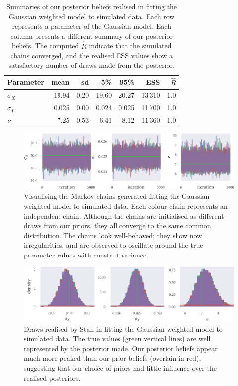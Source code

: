\begin{table}[tbp]
  \begin{tabular}{@{}lrrrrrr@{}}
    \toprule
    Parameter    & mean  & sd   & 5\%   & 95\%  & ESS     & $\widehat{R}$ \\
    \midrule
    $\sigma_{X}$ & 19.94 & 0.20 & 19.60 & 20.27 & 13\,310 & 1.0           \\
    $\sigma_{Y}$ & 0.025 & 0.00 & 0.024 & 0.025 & 11\,700 & 1.0           \\
    $\nu$        & 7.25  & 0.53 & 6.41  & 8.12  & 11\,360 & 1.0           \\
    \bottomrule
  \end{tabular}
  \caption{Summaries of our posterior beliefs realised in fitting the Gaussian
    weighted model to simulated data. Each row represents a parameter of the
    Gaussian model. Each column presents a different summary of our posterior
    beliefs. The computed $\widehat{R}$ indicate that the simulated chains
    converged, and the realised ESS values show a satisfactory number of draws
    made from the posterior.}
  \label{tab:gauss_summary}
\end{table}%
\begin{figure}[tbp]
  \includegraphics{gauss_trace.pdf}
  \caption{Visualising the Markov chains generated fitting the Gaussian
    weighted model to simulated data. Each colour chain represents an independent
    chain. Although the chains are initialised as different draws from our
    priors, they all converge to the same common distribution. The chains look
    well-behaved; they show now irregularities, and are observed to oscillate
    around the true parameter values with constant variance.}
  \label{fig:gauss_trace}
\end{figure}%
\begin{figure}[tbp]
  \includegraphics{gauss_hist.pdf}
  \caption{Draws realised by Stan in fitting the Gaussian weighted model to
    simulated data. The true values (green vertical lines) are well
    represented by the posterior mode. Our posterior beliefs appear much more
    peaked than our prior beliefs (overlain in red), suggesting that our
    choice of priors had little influence over the realised posteriors.}
  \label{fig:gauss_hist}
\end{figure}


